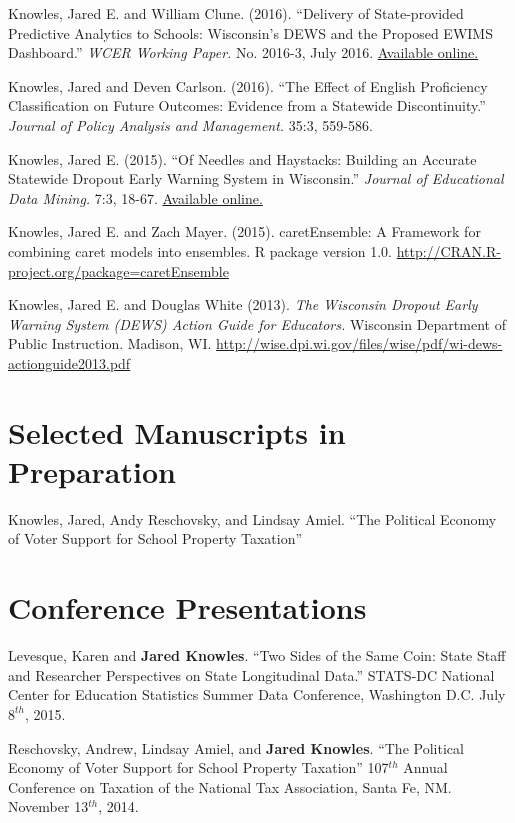 \documentclass[margin,line]{res}
\begin{document}
\begin{resume}
Knowles, Jared E. and William Clune. (2016). ``Delivery of State-provided Predictive
Analytics to Schools: Wisconsin’s DEWS and the Proposed EWIMS Dashboard.'' 
\emph{WCER Working Paper.} No. 2016-3, July 2016. \href{http://wcer-web.ad.education.wisc.edu/docs/working-papers/Working_Paper_No_2016_03.pdf}{Available online.}

Knowles, Jared and Deven Carlson. (2016). ``The Effect of English Proficiency Classification on Future Outcomes: 
Evidence from a Statewide Discontinuity.'' \emph{Journal of Policy Analysis and Management.}
35:3, 559-586. 

Knowles, Jared E. (2015). ``Of Needles and Haystacks: Building an Accurate Statewide 
Dropout Early Warning System in Wisconsin.'' \emph{Journal of Educational Data 
Mining.} 7:3, 18-67. 
\href{http://www.educationaldatamining.org/JEDM/index.php/JEDM/article/view/JEDM082}{Available online.}

Knowles, Jared E. and Zach Mayer. (2015). caretEnsemble: A Framework for combining 
caret models into ensembles. R package version 1.0. \url{http://CRAN.R-project.org/package=caretEnsemble}

Knowles, Jared E. and Douglas White (2013). \emph{The Wisconsin Dropout Early Warning System (DEWS) Action Guide for Educators.} Wisconsin Department of Public Instruction. Madison, WI. \url{http://wise.dpi.wi.gov/files/wise/pdf/wi-dews-actionguide2013.pdf}

\section{\sc Selected Manuscripts in Preparation}

Knowles, Jared, Andy Reschovsky, and Lindsay Amiel. ``The Political Economy of Voter Support for School Property Taxation'' 

\vspace*{5mm}

\section{\sc Conference Presentations}

Levesque, Karen and \textbf{Jared Knowles}. ``Two Sides of the Same Coin: State 
Staff and Researcher Perspectives on State Longitudinal Data.'' STATS-DC National Center for Education Statistics Summer Data Conference, Washington D.C. July $8^{th}$, 2015.

Reschovsky, Andrew, Lindsay Amiel, and \textbf{Jared Knowles}. ``The Political Economy of Voter Support for School Property Taxation'' 107$^{th}$ Annual Conference on Taxation of the National Tax Association, Santa Fe, NM. November 13$^{th}$, 2014. 


\end{resume}
\end{document}
